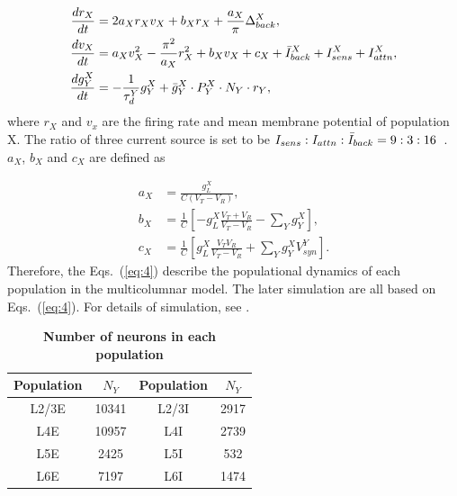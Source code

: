 \documentclass[10pt,letterpaper]{article}
\begin{document}
\begin{subequations}
\label{eq:4}
\begin{align}
    \frac{dr_{X}}{dt} &= 2a_{X}r_{X}v_{X} + b_{X}r_{X} + \frac{a_{X}}{\pi}\Delta_{back}^{X}, \label{eq:4a}\\
    \frac{dv_{X}}{dt} &= a_{X}v_{X}^{2} - \frac{\pi^{2}}{a_{X}}r_{X}^{2} + b_{X}v_{X} + c_{X} + \Bar{I}_{back}^{X} + I_{sens}^{X} + I_{attn}^{X},  \label{eq:4b}\\
    \frac{dg_{Y}^{X}}{dt} &= -\frac{1}{\tau_{d}^{Y}}g_{Y}^{X} + \Bar{g}_{Y}^{X}\cdot P_{Y}^{X}\cdot N_{Y}\cdot r_{Y}, \label{eq:4c}
\end{align}
\end{subequations}
where $r_{X}$ and $v_{x}$ are the firing rate and mean membrane potential of population X. The ratio of three current source is set to be $I_{sens}:I_{attn}:\Bar{I}_{back}=9:3:16$~\cite{wagatsuma2011}. $a_{X}$, $b_{X}$ and $c_{X}$ are defined as

\begin{subequations}
\label{eq:5}
\begin{align}
    a_{X}& = \frac{g_{L}^{X}}{C(V_{T}-V_{R})}, \label{eq:5a}\\
    b_{X}& = \frac{1}{C} \left[ -g_{L}^{X}\frac{V_{T}+V_{R}}{V_{T}-V_{R}}-\sum_{Y}g_{Y}^{X} \right],  \label{eq:5b}\\
    c_{X}& = \frac{1}{C} \left[ g_{L}^{X}\frac{V_{T}V_{R}}{V_{T}-V_{R}}+\sum_{Y}g_{Y}^{X}V_{syn}^{Y} \right]. \label{eq:5c}
\end{align}
\end{subequations}
Therefore, the Eqs.~(\ref{eq:4}) describe the populational dynamics of each population in the multicolumnar model. The later simulation are all based on Eqs.~(\ref{eq:4}). For details of simulation, see .

\begin{table}[!ht]
\centering
\caption{
{\bf Number of neurons in each population}}
\begin{tabular}[t]{cccc}
\toprule
Population & $N_{Y}$ & Population & $N_{Y}$\\
\midrule
L2/3E & 10341 & L2/3I & 2917 \\
L4E & 10957 & L4I & 2739 \\
L5E & 2425 & L5I & 532 \\
L6E & 7197 & L6I & 1474 \\
\bottomrule
\end{tabular}
\label{table1}
\end{table}
\end{document}
